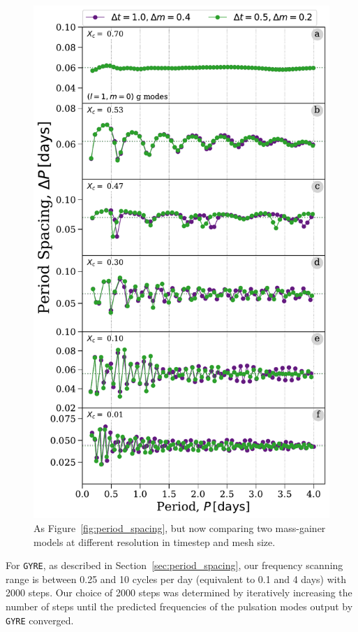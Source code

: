 \documentclass[desactivate]{aa}
\begin{document}
\begin{figure}
    \centering
    \includegraphics[width=\columnwidth]{paper/figures/period_spacing_convergence.pdf}
    \caption{As Figure~\ref{fig:period_spacing}, but now comparing two mass-gainer models at different resolution in timestep and mesh size.}
    \label{fig:period_spacing_convergence}
\end{figure}

For \texttt{GYRE}, as described in Section~\ref{sec:period_spacing}, our frequency scanning range is between 0.25 and 10 cycles per day (equivalent to 0.1 and 4 days) with 2000 steps. Our choice of 2000 steps was determined by iteratively increasing the number of steps until the predicted frequencies of the pulsation modes output by \texttt{GYRE} converged.
\end{document}
